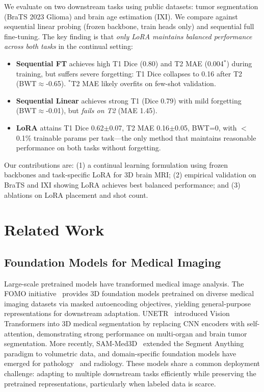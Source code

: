 \documentclass[journal,twoside,web]{ieeecolor}
\begin{document}
We evaluate on two downstream tasks using public datasets: tumor segmentation (BraTS 2023 Glioma) and brain age estimation (IXI). We compare against sequential linear probing (frozen backbone, train heads only) and sequential full fine-tuning. The key finding is that \emph{only LoRA maintains balanced performance across both tasks} in the continual setting:
\begin{itemize}
\item \textbf{Sequential FT} achieves high T1 Dice (0.80) and T2 MAE (0.004$^*$) during training, but suffers severe forgetting: T1 Dice collapses to 0.16 after T2 (BWT$\approx$-0.65). $^*$T2 MAE likely overfits on few-shot validation.
\item \textbf{Sequential Linear} achieves strong T1 (Dice 0.79) with mild forgetting (BWT$\approx$-0.01), but \emph{fails on T2} (MAE 1.45).
\item \textbf{LoRA} attains T1 Dice 0.62$\pm$0.07, T2 MAE 0.16$\pm$0.05, BWT=0, with $<$0.1\% trainable params per task---the only method that maintains reasonable performance on both tasks without forgetting.
\end{itemize}

Our contributions are: (1) a continual learning formulation using frozen backbones and task-specific LoRA for 3D brain MRI; (2) empirical validation on BraTS and IXI showing LoRA achieves best balanced performance; and (3) ablations on LoRA placement and shot count.


\section{Related Work}
\label{sec:related}

\subsection{Foundation Models for Medical Imaging}

Large-scale pretrained models have transformed medical image analysis. The FOMO initiative~\cite{fomo2025} provides 3D foundation models pretrained on diverse medical imaging datasets via masked autoencoding objectives, yielding general-purpose representations for downstream adaptation. UNETR~\cite{unetr} introduced Vision Transformers into 3D medical segmentation by replacing CNN encoders with self-attention, demonstrating strong performance on multi-organ and brain tumor segmentation. More recently, SAM-Med3D~\cite{sammed3d} extended the Segment Anything paradigm to volumetric data, and domain-specific foundation models have emerged for pathology~\cite{chen2024towards} and radiology. These models share a common deployment challenge: adapting to multiple downstream tasks efficiently while preserving the pretrained representations, particularly when labeled data is scarce.
\end{document}
